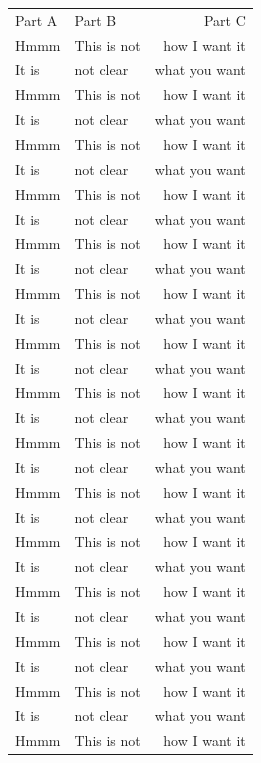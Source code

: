 \documentclass[phd]{ndsu-thesis-2022}
\begin{document}
\begin{longtable}{l @{\hspace{2cm}} l @{\hspace{1.5cm}} r}
Part A  &   Part B      &   Part C      \\
Hmmm    & This is not   & how I want it \\
It is   & not clear     & what you want \\
Hmmm    & This is not   & how I want it \\
It is   & not clear     & what you want \\
Hmmm    & This is not   & how I want it \\
It is   & not clear     & what you want \\
Hmmm    & This is not   & how I want it \\
It is   & not clear     & what you want \\
Hmmm    & This is not   & how I want it \\
It is   & not clear     & what you want \\
Hmmm    & This is not   & how I want it \\
It is   & not clear     & what you want \\
Hmmm    & This is not   & how I want it \\
It is   & not clear     & what you want \\
Hmmm    & This is not   & how I want it \\
It is   & not clear     & what you want \\
Hmmm    & This is not   & how I want it \\
It is   & not clear     & what you want \\
Hmmm    & This is not   & how I want it \\
It is   & not clear     & what you want \\
Hmmm    & This is not   & how I want it \\
It is   & not clear     & what you want \\
Hmmm    & This is not   & how I want it \\
It is   & not clear     & what you want \\
Hmmm    & This is not   & how I want it \\
It is   & not clear     & what you want \\
Hmmm    & This is not   & how I want it \\
It is   & not clear     & what you want \\
Hmmm    & This is not   & how I want it \\

\end{longtable}
\end{document}
